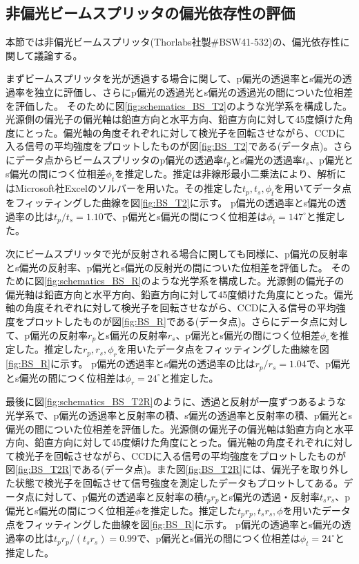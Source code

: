\documentclass[11pt,a4paper]{jsarticle}
\begin{document}
\subsection{非偏光ビームスプリッタの偏光依存性の評価}
\label{seq:BS_characterization}
本節では非偏光ビームスプリッタ(Thorlabs社製\#BSW41-532)の、偏光依存性に関して議論する。

まずビームスプリッタを光が透過する場合に関して、p偏光の透過率とs偏光の透過率を独立に評価し、さらにp偏光の透過光とs偏光の透過光の間についた位相差を評価した。
そのために図\ref{fig:schematics_BS_T2}のような光学系を構成した。光源側の偏光子の偏光軸は鉛直方向と水平方向、鉛直方向に対して45度傾けた角度にとった。偏光軸の角度それぞれに対して検光子を回転させながら、CCDに入る信号の平均強度をプロットしたものが図\ref{fig:BS_T2}である(データ点)。さらにデータ点からビームスプリッタのp偏光の透過率$t_p$とs偏光の透過率$t_s$、p偏光とs偏光の間につく位相差$\phi_t$を推定した。推定は非線形最小二乗法により、解析にはMicrosoft社Excelのソルバーを用いた。その推定した$t_p,t_s,\phi_t$を用いてデータ点をフィッティングした曲線を図\ref{fig:BS_T2}に示す。
p偏光の透過率とs偏光の透過率の比は$t_p/t_s=1.10$で、p偏光とs偏光の間につく位相差は$\phi_t=147^\circ$と推定した。

次にビームスプリッタで光が反射される場合に関しても同様に、p偏光の反射率とs偏光の反射率、p偏光とs偏光の反射光の間についた位相差を評価した。
そのために図\ref{fig:schematics_BS_R}のような光学系を構成した。光源側の偏光子の偏光軸は鉛直方向と水平方向、鉛直方向に対して45度傾けた角度にとった。偏光軸の角度それぞれに対して検光子を回転させながら、CCDに入る信号の平均強度をプロットしたものが図\ref{fig:BS_R}である(データ点)。さらにデータ点に対して、p偏光の反射率$r_p$とs偏光の反射率$r_s$、p偏光とs偏光の間につく位相差$\phi_r$を推定した。推定した$r_p,r_s,\phi_r$を用いたデータ点をフィッティングした曲線を図\ref{fig:BS_R}に示す。
p偏光の透過率とs偏光の透過率の比は$r_p/r_s=1.04$で、p偏光とs偏光の間につく位相差は$\phi_r=24^\circ$と推定した。

最後に図\ref{fig:schematics_BS_T2R}のように、透過と反射が一度ずつあるような光学系で、p偏光の透過率と反射率の積、s偏光の透過率と反射率の積、p偏光とs偏光の間についた位相差を評価した。光源側の偏光子の偏光軸は鉛直方向と水平方向、鉛直方向に対して45度傾けた角度にとった。偏光軸の角度それぞれに対して検光子を回転させながら、CCDに入る信号の平均強度をプロットしたものが図\ref{fig:BS_T2R}である(データ点)。また図\ref{fig:BS_T2R}には、偏光子を取り外した状態で検光子を回転させて信号強度を測定したデータもプロットしてある。データ点に対して、p偏光の透過率と反射率の積$t_pr_p$とs偏光の透過・反射率$t_sr_s$、p偏光とs偏光の間につく位相差$\phi$を推定した。推定した$t_pr_p,t_sr_s,\phi$を用いたデータ点をフィッティングした曲線を図\ref{fig:BS_R}に示す。
p偏光の透過率とs偏光の透過率の比は$t_pr_p/(t_sr_s)=0.99$で、p偏光とs偏光の間につく位相差は$\phi_t=24^\circ$と推定した。
\end{document}
